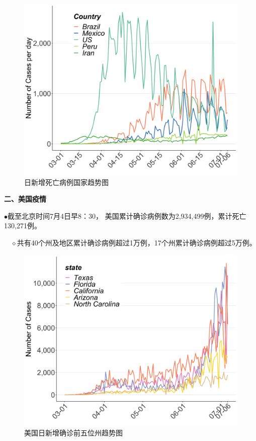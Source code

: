 \documentclass[
]{article}
\begin{document}
\begin{figure}[H]
\centering
{}
\caption{日新增死亡病例国家趋势图}
\includegraphics[]{./input/covid3.png}
\end{figure}

\vspace{-7mm}

\begin{huge}{\textcolor{glaucous}{\textbf {二、美国疫情}}}\end{huge}

\vspace{-5mm}

\(\bullet\)截至北京时间7月4日早8：30，
美国累计确诊病例数为2,934,499例，累计死亡130,271例。

\(\quad\)\(\diamond\)共有40个州及地区累计确诊病例超过1万例，17个州累计确诊病例超过5万例。

\begin{figure}[H]
\centering
{}
\caption{美国日新增确诊前五位州趋势图}
\includegraphics[]{./input/covid5.png}
\end{figure}
\end{document}

